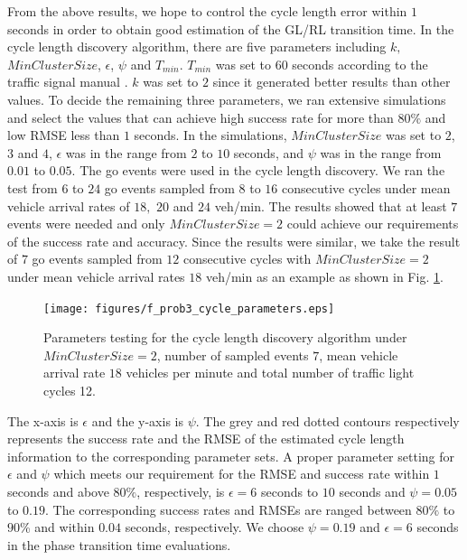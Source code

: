 \documentclass[final,oneside,onecolumn,12pt,a4paper]{book}%
\begin{document}
From the above results, we hope to control the cycle length error within $1$
seconds in order to obtain good estimation of the GL/RL transition time. In
the cycle length discovery algorithm, there are five parameters including $k,$
$MinClusterSize$, $\epsilon$, $\psi$ and $T_{min}$. $T_{min}$ was set to $60$
seconds according to the traffic signal manual \cite{TSTM2008}. $k$ was set to
$2$ since it generated better results than other values. To decide the
remaining three parameters, we ran extensive simulations and select the values
that can achieve high success rate for more than $80\%$ and low RMSE less than
$1$ seconds. In the simulations, $MinClusterSize$ was set to $2$, $3$ and $4$,
$\epsilon$ was in the range from $2$ to $10$ seconds, and $\psi$ was in the
range from $0.01$ to $0.05$. The go events were used in the cycle length
discovery. We ran the test from $6$ to $24$ go events sampled from $8$ to $16$
consecutive cycles under mean vehicle arrival rates of $18,$ $20$ and $24$
veh/min. The results showed that at least $7$ events were needed and only
$MinClusterSize=2$ could achieve our requirements of the success rate and
accuracy. Since the results were similar, we take the result of $7$ go events
sampled from $12$ consecutive cycles with $MinClusterSize=2$ under mean
vehicle arrival rates $18$ veh/min as an example as shown in Fig.
\ref{fig:f_prob3_cycle_parameters}. \begin{figure}[th]
\centerline{\texttt{[image: figures/f\_prob3\_cycle\_parameters.eps]}} \hfill\caption{Parameters testing for
the cycle length discovery algorithm under $MinClusterSize=2$, number of
sampled events $7$, mean vehicle arrival rate $18$ vehicles per minute and
total number of traffic light cycles 12.}%
\label{fig:f_prob3_cycle_parameters}%
\end{figure}The x-axis is $\epsilon$ and the y-axis is $\psi$. The grey and
red dotted contours respectively represents the success rate and the RMSE of
the estimated cycle length information to the corresponding parameter sets. A
proper parameter setting for $\epsilon$ and $\psi$ which meets our requirement
for the RMSE and success rate within $1$ seconds and above $80\%$,
respectively, is $\epsilon=6$ seconds to $10$ seconds and $\psi=0.05$ to
$0.19$. The corresponding success rates and RMSEs are ranged between $80\%$ to
$90$\% and within $0.04$ seconds, respectively. We choose $\psi=0.19$ and
$\epsilon=6$ seconds in the phase transition time evaluations.
\end{document}
